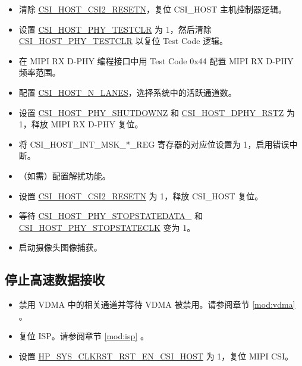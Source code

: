 \documentclass[main\_\_CN.tex]{subfiles}
\begin{document}
\begin{itemize}
    \item 清除 \hyperref[fielddesc:CSIHOSTCSI2RESETN]{CSI\_HOST\_CSI2\_RESETN}，复位 CSI\_HOST 主机控制器逻辑。
    \item 设置 \hyperref[fielddesc:CSIHOSTPHYTESTCLR]{CSI\_HOST\_PHY\_TESTCLR} 为 1，然后清除 \hyperref[fielddesc:CSIHOSTPHYTESTCLR]{CSI\_HOST\_PHY\_TESTCLR} 以复位 Test Code 逻辑。
    \item 在 MIPI RX D-PHY 编程接口中用 Test Code 0x44 配置 MIPI RX D-PHY 频率范围。
    \item 配置 \hyperref[fielddesc:CSIHOSTNLANES]{CSI\_HOST\_N\_LANES}，选择系统中的活跃通道数。
    \item 设置 \hyperref[fielddesc:CSIHOSTPHYSHUTDOWNZ]{CSI\_HOST\_PHY\_SHUTDOWNZ} 和 \hyperref[fielddesc:CSIHOSTDPHYRSTZ]{CSI\_HOST\_DPHY\_RSTZ} 为 1，释放 MIPI RX D-PHY 复位。
    \item 将 CSI\_HOST\_INT\_MSK\_*\_REG 寄存器的对应位设置为 1，启用错误中断。
    \item（如需）配置解扰功能。
    \item 设置 \hyperref[fielddesc:CSIHOSTCSI2RESETN]{CSI\_HOST\_CSI2\_RESETN} 为 1，释放 CSI\_HOST 复位。
    \item 等待 \hyperref[fielddesc:CSIHOSTPHYSTOPSTATEDATA0]{CSI\_HOST\_PHY\_STOPSTATEDATA\_} 和 \hyperref[fielddesc:CSIHOSTPHYSTOPSTATECLK]{CSI\_HOST\_PHY\_STOPSTATECLK} 变为 1。
    \item 启动摄像头图像捕获。
\end{itemize}

\subsection{停止高速数据接收}

\begin{itemize}
    \item 禁用 VDMA 中的相关通道并等待 VDMA 被禁用。请参阅章节 \ref{mod:vdma} \textit{}。
    \item 复位 ISP。请参阅章节 \ref{mod:isp} \textit{}。
    \item 设置 \hyperref[fielddesc:HPSYSCLKRSTRSTENCSIHOST]{HP\_SYS\_CLKRST\_RST\_EN\_CSI\_HOST} 为 1，复位 MIPI CSI。
\end{itemize}

\end{document}
